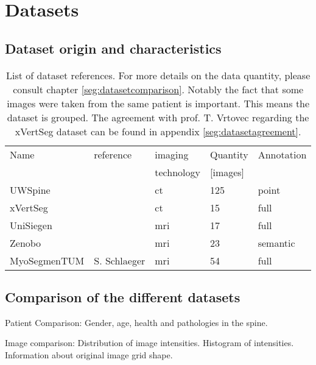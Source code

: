 \chapter{Datasets}

\section{Dataset origin and characteristics}

\begin{SCtable}[\sidecaptionrelwidth][h]
 
    \begin{tabular}{ l l l l l} 
     \hline
     \hline
     Name & reference & imaging & Quantity & Annotation \\
          &           & technology & [images] & \\
     \hline 
    UWSpine & \cite{Glocker}  & \acrshort{ct} & 125 & point  \\ 
    xVertSeg & \cite{Yoa2015} & \acrshort{ct} & 15 & full \\
    UniSiegen  &  & \acrshort{mri} & 17 & full \\
    Zenobo & & \acrshort{mri} & 23 & semantic \\
    MyoSegmenTUM & S. Schlaeger & \acrshort{mri} &  54 & full \\
     \hline
     \hline
    \end{tabular}
    \caption{List of dataset references. For more details on the data quantity, please consult chapter \ref{seg:datasetcomparison}. Notably the fact that some images were taken from the same patient is important. This means the dataset is grouped. The agreement with prof. T. Vrtovec regarding the xVertSeg dataset can be found in appendix \ref{seg:datasetagreement}.}

\end{SCtable}

\section{Comparison of the different datasets\label{seg:datasetcomparison}}

Patient Comparison: Gender, age, health and pathologies in the spine.

Image comparison: 
Distribution of image intensities. Histogram of intensities.
Information about original image grid shape.